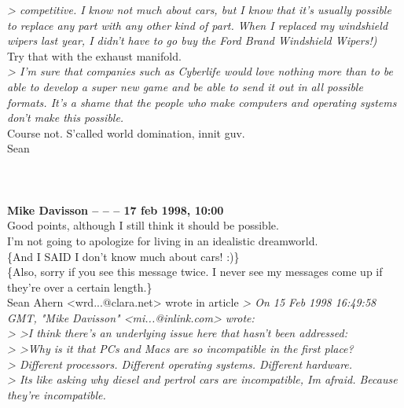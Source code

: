 \documentclass[11pt,twoside,a4paper]{article}
\begin{document}
\begin{multicols*}{2}
\emph{> competitive.  I know not much about cars, but I know that it's usually possible to replace any part with any other kind of part. When I replaced my windshield wipers last year, I didn't have to go buy the Ford Brand Windshield Wipers!)}~\\

   Try that with the exhaust manifold.~\\

\emph{> I'm sure that companies such as Cyberlife would love nothing more than to be able to develop a super new game and be able to send it out in all possible formats.  It's a shame that the people who make computers and operating systems don't make this possible.}~\\

  Course not.  S'called world domination, innit guv.~\\

                Sean~\\

 
		
	
		
~\\ ~\\ ~\\ \textbf{Mike Davisson -- -- -- 17 feb 1998, 10:00}~\\

Good points, although I still think it should be possible.~\\
I'm not going to apologize for living in an idealistic dreamworld.~\\
\{And I SAID I don't know much about cars! :)\}~\\
\{Also, sorry if you see this message twice.  I never see my messages come up if they're over a certain length.\}~\\

Sean Ahern <wrd...@clara.net> wrote in article %
\emph{> On 15 Feb 1998 16:49:58 GMT, "Mike Davisson" <mi...@inlink.com> wrote:}~\\
\emph{> >I think there's an underlying issue here that hasn't been addressed:}~\\
\emph{> >Why is it that PCs and Macs are so incompatible in the first place?}~\\
\emph{> Different processors.   Different operating systems.  Different hardware.}~\\
\emph{> Its like asking why diesel and pertrol cars are incompatible, Im afraid.  Because they're incompatible.}~\\  


\end{multicols*}
\end{document}
